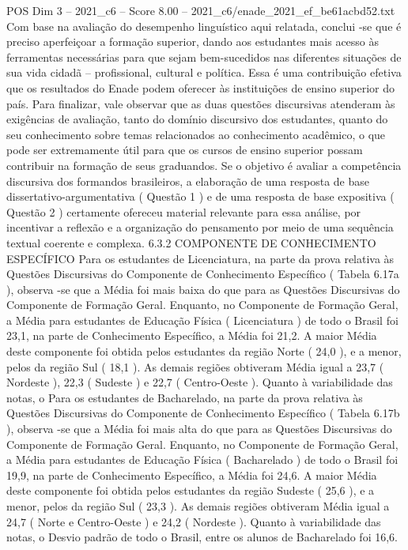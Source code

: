 \begin{textsample}{POS Dim 3 – 2021\_c6 – Score 8.00 – 2021\_c6/enade\_2021\_ef\_be61acbd52.txt}
Com base na avaliação do desempenho linguístico aqui relatada, conclui -se que é preciso aperfeiçoar a formação superior, dando aos estudantes mais acesso às ferramentas necessárias para que sejam bem-sucedidos nas diferentes situações de sua vida cidadã – profissional, cultural e política.
Essa é uma contribuição efetiva que os resultados do Enade podem oferecer às instituições de ensino superior do país.
Para finalizar, vale observar que as duas questões discursivas atenderam às exigências de avaliação, tanto do domínio discursivo dos estudantes, quanto do seu conhecimento sobre temas relacionados ao conhecimento acadêmico, o que pode ser extremamente útil para que os cursos de ensino superior possam contribuir na formação de seus graduandos.
Se o objetivo é avaliar a competência discursiva dos formandos brasileiros, a elaboração de uma resposta de base dissertativo-argumentativa ( Questão 1 ) e de uma resposta de base expositiva ( Questão 2 ) certamente ofereceu material relevante para essa análise, por incentivar a reflexão e a organização do pensamento por meio de uma sequência textual coerente e complexa. 6.3.2 COMPONENTE DE CONHECIMENTO ESPECÍFICO Para os estudantes de Licenciatura, na parte da prova relativa às Questões Discursivas do Componente de Conhecimento Específico ( Tabela 6.17a ), observa -se que a Média foi mais baixa do que para as Questões Discursivas do Componente de Formação Geral.
Enquanto, no Componente de Formação Geral, a Média para estudantes de Educação Física ( Licenciatura ) de todo o Brasil foi 23,1, na parte de Conhecimento Específico, a Média foi 21,2.
A maior Média deste componente foi obtida pelos estudantes da região Norte ( 24,0 ), e a menor, pelos da região Sul ( 18,1 ).
As demais regiões obtiveram Média igual a 23,7 ( Nordeste ), 22,3 ( Sudeste ) e 22,7 ( Centro-Oeste ).
Quanto à variabilidade das notas, o Para os estudantes de Bacharelado, na parte da prova relativa às Questões Discursivas do Componente de Conhecimento Específico ( Tabela 6.17b ), observa -se que a Média foi mais alta do que para as Questões Discursivas do Componente de Formação Geral.
Enquanto, no Componente de Formação Geral, a Média para estudantes de Educação Física ( Bacharelado ) de todo o Brasil foi 19,9, na parte de Conhecimento Específico, a Média foi 24,6.
A maior Média deste componente foi obtida pelos estudantes da região Sudeste ( 25,6 ), e a menor, pelos da região Sul ( 23,3 ).
As demais regiões obtiveram Média igual a 24,7 ( Norte e Centro-Oeste ) e 24,2 ( Nordeste ).
Quanto à variabilidade das notas, o Desvio padrão de todo o Brasil, entre os alunos de Bacharelado foi 16,6.

\end{textsample}
